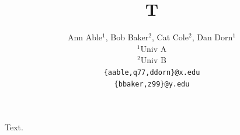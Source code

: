 \documentclass{article}
\title{T}
\author{Ann Able$^1$, Bob Baker$^2$, Cat Cole$^2$, Dan Dorn$^1$ \\ $^1$Univ A \\ $^2$Univ B \\
\texttt{\{aable,q77,ddorn\}@x.edu} \\ \texttt{\{bbaker,z99\}@y.edu}}
\begin{document}
\maketitle
Text.
\end{document}
